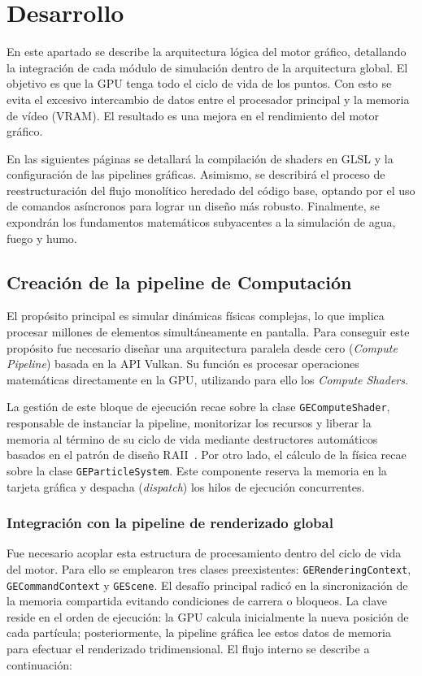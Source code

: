 \chapter{Desarrollo}
En este apartado se describe la arquitectura lógica del motor gráfico, detallando la integración de cada módulo de simulación dentro de la arquitectura global. 
El objetivo es que la GPU tenga todo el ciclo de vida de los puntos. Con esto se evita el excesivo intercambio de datos entre el procesador principal y la memoria de vídeo (VRAM). El resultado es una mejora en el rendimiento del motor gráfico.

En las siguientes páginas se detallará la compilación de shaders en GLSL y la configuración de las pipelines gráficas. Asimismo, se describirá el proceso de reestructuración del flujo monolítico heredado del código base, optando por el uso de comandos asíncronos para lograr un diseño más robusto. Finalmente, se expondrán los fundamentos matemáticos subyacentes a la simulación de agua, fuego y humo.

\section{Creación de la pipeline de Computación}

El propósito principal es simular dinámicas físicas complejas, lo que implica procesar millones de elementos simultáneamente en pantalla. Para conseguir este propósito fue necesario diseñar una arquitectura paralela desde cero (\textit{Compute Pipeline}) basada en la API Vulkan. Su función es procesar operaciones matemáticas directamente en la GPU, utilizando para ello los \textit{Compute Shaders}.

La gestión de este bloque de ejecución recae sobre la clase \texttt{GEComputeShader}, responsable de instanciar la pipeline, monitorizar los recursos y liberar la memoria al término de su ciclo de vida mediante destructores automáticos basados en el patrón de diseño RAII~\parencite{stroustrup2013cpp}. Por otro lado, el cálculo de la física recae sobre la clase \texttt{GEParticleSystem}. Este componente reserva la memoria en la tarjeta gráfica y despacha (\textit{dispatch}) los hilos de ejecución concurrentes.

\subsection{Integración con la pipeline de renderizado global}

Fue necesario acoplar esta estructura de procesamiento dentro del ciclo de vida del motor. Para ello se emplearon tres clases preexistentes: \texttt{GERenderingContext}, \texttt{GECommandContext} y \texttt{GEScene}. El desafío principal radicó en la sincronización de la memoria compartida evitando condiciones de carrera o bloqueos. La clave reside en el orden de ejecución: la GPU calcula inicialmente la nueva posición de cada partícula; posteriormente, la pipeline gráfica lee estos datos de memoria para efectuar el renderizado tridimensional. El flujo interno se describe a continuación:

